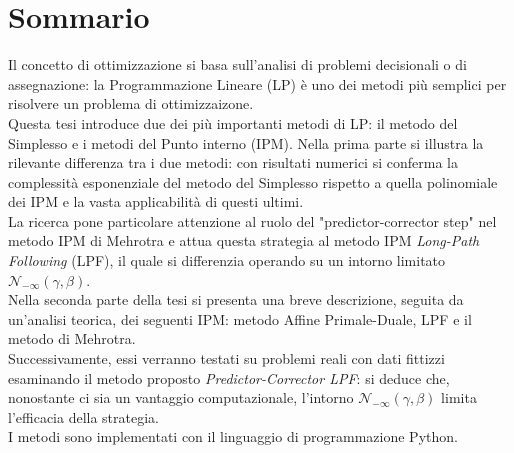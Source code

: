 \documentclass[a4paper,10 pt,titlepage,twoside]{book}
\theoremstyle{plain}
\theoremstyle{definition}
\theoremstyle{remark}
\begin{document}
\chapter*{Sommario}
Il concetto di ottimizzazione si basa sull'analisi di problemi decisionali o di assegnazione: la Programmazione Lineare (LP) è uno dei metodi più semplici per risolvere un problema di ottimizzaizone.\\ 
Questa tesi introduce due dei più importanti metodi di LP: il metodo del Simplesso e i metodi del Punto interno (IPM). Nella prima parte si illustra la rilevante differenza tra i due metodi: con risultati numerici si conferma la complessità esponenziale del metodo del Simplesso rispetto a quella polinomiale dei IPM e la vasta applicabilità di questi ultimi.\\
La ricerca pone particolare attenzione al ruolo del "predictor-corrector step" nel metodo IPM di Mehrotra e attua questa strategia al metodo IPM \textit{Long-Path Following} (LPF), il quale si differenzia operando su un intorno limitato $\mathcal{N}_{-\infty}(\gamma,\beta)$.\\
Nella seconda parte della tesi si presenta una breve descrizione, seguita da un'analisi teorica, dei seguenti IPM: metodo Affine Primale-Duale, LPF e il metodo di Mehrotra.\\
Successivamente, essi verranno testati su problemi reali con dati fittizzi esaminando il metodo proposto \textit{Predictor-Corrector LPF}: si deduce che, nonostante ci sia un vantaggio computazionale, l'intorno $\mathcal{N}_{-\infty}(\gamma,\beta)$ limita l'efficacia della strategia.\\   
I metodi sono implementati con il linguaggio di programmazione Python. 
\end{document}
